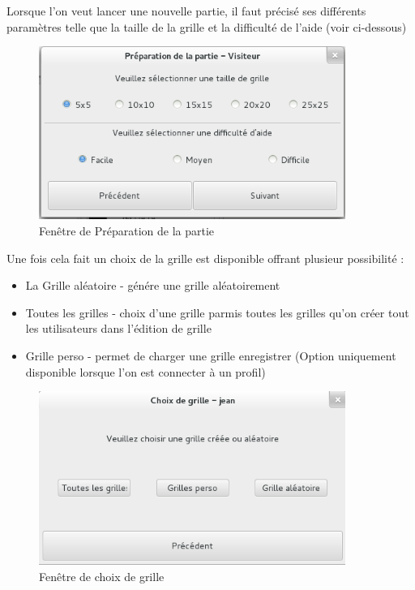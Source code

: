 \documentclass[11pt]{article}
\begin{document}
Lorsque l'on veut lancer une nouvelle partie, il faut précisé ses différents paramètres telle que la taille de la grille et la difficulté de l'aide (voir ci-dessous)

	\begin{figure}[!ht]
		\centering
		\includegraphics[width=10cm]{./Screenshot/PrepaPartie.png}
		\caption{Fenêtre de Préparation de la partie}
	\end{figure}


Une fois cela fait un choix de la grille est disponible offrant plusieur possibilité :
	
	\begin{itemize}
		\item La Grille aléatoire - génére une grille aléatoirement
		\item Toutes les grilles - choix d'une grille parmis toutes les grilles qu'on créer tout les utilisateurs dans l'édition de grille
		\item Grille perso - permet de charger une grille enregistrer (Option uniquement disponible lorsque l'on est connecter à un profil)
	\end{itemize}

	\begin{figure}[!ht]
		\centering
		\includegraphics[width=10cm]{./Screenshot/ChoixGrille.png}
		\caption{Fenêtre de choix de grille}
	\end{figure}
\end{document}

